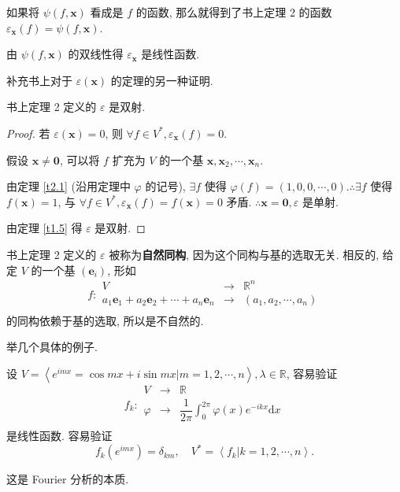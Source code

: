 \documentclass[color=black,device=normal,lang=cn,mode=geye]{elegantnote}
\begin{document}
如果将 $\psi(f,\boldsymbol{x})$ 看成是 $f$ 的函数, 那么就得到了书上定理 2 的函数 $\varepsilon_{\boldsymbol{x}}(f)=\psi(f,\boldsymbol{x})$.

由 $\psi(f,\boldsymbol{x})$ 的双线性得 $\varepsilon_{\boldsymbol{x}}$ 是线性函数.

补充书上对于 $\varepsilon(\boldsymbol{x})$ 的定理的另一种证明.
\begin{theorem}
    书上定理 2 定义的 $\varepsilon$ 是双射.
\end{theorem}
\begin{proof}
    若 $\varepsilon(\boldsymbol{x})=0$, 则 $\forall f\in V^*,\varepsilon_{\boldsymbol{x}}(f)=0$.

    假设 $\boldsymbol{x}\neq\boldsymbol{0}$, 可以将 $f$ 扩充为 $V$ 的一个基 $\boldsymbol{x},\boldsymbol{x}_2,\cdots,\boldsymbol{x}_n$.
    
    由定理 \ref{t2.1} (沿用定理中 $\varphi$ 的记号), $\exists f$ 使得 $\varphi(f)=(1,0,0,\cdots,0).\therefore\exists f$ 使得 $f(\boldsymbol{x})=1$, 与 $\forall f\in V^*,\varepsilon_{\boldsymbol{x}}(f)=f(\boldsymbol{x})=0$ 矛盾. $\therefore\boldsymbol{x}=\boldsymbol{0},\varepsilon$ 是单射.

    由定理 \ref{t1.5} 得 $\varepsilon$ 是双射.
\end{proof}

书上定理 2 定义的 $\varepsilon$ 被称为\textbf{自然同构}, 因为这个同构与基的选取无关. 相反的, 给定 $V$ 的一个基 $(\boldsymbol{e}_i)$, 形如
\[f:\begin{array}{rcl}
    V & \to & \mathbb{R}^n \\
    a_1\boldsymbol{e}_1+a_2\boldsymbol{e}_2+\cdots+a_n\boldsymbol{e}_n & \to & (a_1,a_2,\cdots,a_n) \\
\end{array}\]
的同构依赖于基的选取, 所以是不自然的.

举几个具体的例子.
\begin{example}
    设 $V=\left<e^{imx}=\cos mx+i\sin mx|m=1,2,\cdots,n\right>,\lambda\in\mathbb{R}$, 
    容易验证
    \[f_k:\begin{array}{rcl}
        V & \to & \mathbb{R} \\
        \varphi & \to & \dfrac{1}{2\pi}\int_0^{2\pi}\varphi(x)e^{-ikx}\mathrm{d}x \\
    \end{array}\]
    是线性函数. 容易验证
    \[f_k(e^{imx})=\delta_{km},\quad V^*=\left<f_k|k=1,2,\cdots,n\right>.\]

    这是 Fourier 分析的本质.
\end{example}
\end{document}
